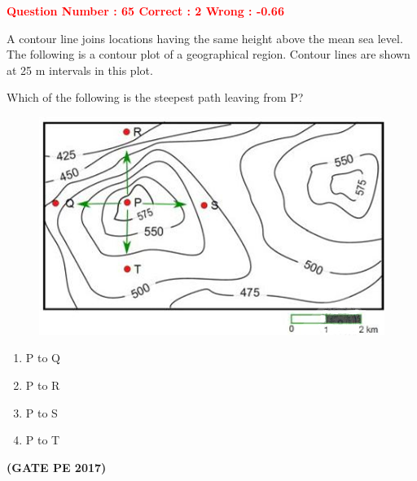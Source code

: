 \documentclass[12pt]{article}
\begin{document}
{\textcolor{red}{\textbf{Question Number : 65 \hfill Correct : 2  Wrong : -0.66}}



A contour line joins locations having the same height above the mean sea level. The following is a contour plot of a geographical region. Contour lines are shown at 25 m intervals in this plot.

Which of the following is the steepest path leaving from P?

\begin{figure}[hbtp!]
    \centering
    \includegraphics[width=0.7\linewidth]{Figs/Graph_Q65.png}
\end{figure}

\begin{enumerate}[label=(\Alph*)]
    \item P to Q
    \item P to R
    \item P to S
    \item P to T
\end{enumerate}

\hfill\textbf{(GATE PE 2017)}\\[0.6cm]

}

\newpage

\renewcommand{\arraystretch}{1.3}


\end{document}
